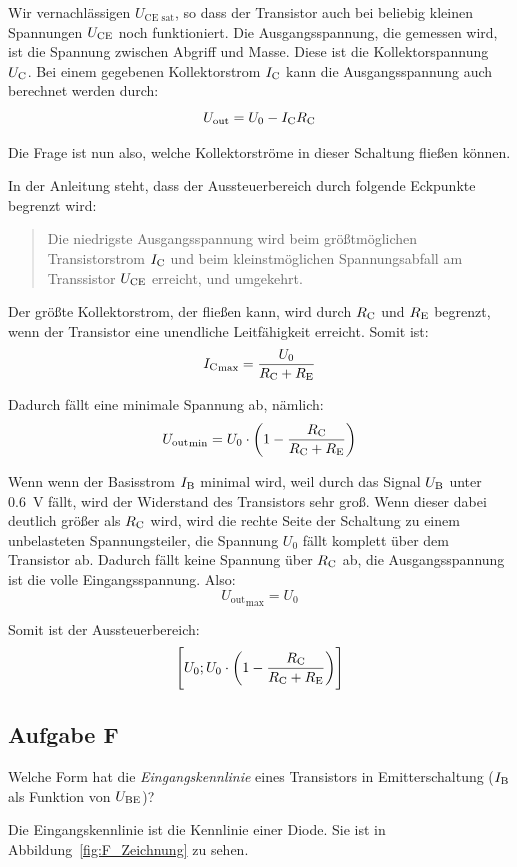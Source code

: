 Wir vernachlässigen $U_\text{CE sat}$, so dass der Transistor auch bei beliebig
kleinen Spannungen $U_\text{CE}$ noch funktioniert. Die Ausgangsspannung, die gemessen
wird, ist die Spannung zwischen Abgriff und Masse. Diese ist die
Kollektorspannung $U_\text{C}$. Bei einem gegebenen Kollektorstrom $I_\text{C}$ kann die
Ausgangsspannung auch berechnet werden durch:
\[
	U_\text{out} = U_0 - I_\text{C}R_\text{C}
\]

Die Frage ist nun also, welche Kollektorströme in dieser Schaltung fließen
können.

In der Anleitung steht, dass der Aussteuerbereich durch folgende
Eckpunkte begrenzt wird:

\begin{quote}
	Die niedrigste Ausgangsspannung wird beim größtmöglichen Transistorstrom
	$I_\text{C}$ und beim kleinstmöglichen Spannungsabfall am Transsistor $U_\text{CE}$
	erreicht, und umgekehrt. \cite[§3/4.3.1]{physik313-Anleitung}
\end{quote}

Der größte Kollektorstrom, der fließen kann, wird durch $R_\text{C}$ und $R_\text{E}$
begrenzt, wenn der Transistor eine unendliche Leitfähigkeit erreicht. Somit
ist:
\[
	{I_\text{C}}_\text{max} = \frac{U_0}{R_\text{C} + R_\text{E}}
\]

Dadurch fällt eine minimale Spannung ab, nämlich:
\[
	{U_\text{out}}_\text{min} = U_0 \cdot \del{1 - \frac{\RC}{\RC + \RE}}
\]

Wenn wenn der Basisstrom $I_\text{B}$ minimal wird, weil durch das Signal $U_\text{B}$
unter \SI{0.6}{\volt} fällt, wird der Widerstand des Transistors sehr groß.
Wenn dieser dabei deutlich größer als $R_\text{C}$ wird, wird die rechte Seite der
Schaltung zu einem unbelasteten Spannungsteiler, die Spannung $U_0$ fällt
komplett über dem Transistor ab. Dadurch fällt keine Spannung über $R_\text{C}$ ab,
die Ausgangsspannung ist die volle Eingangsspannung. Also:
\[
	{U_\text{out}}_\text{max} = U_0
\]

Somit ist der Aussteuerbereich:
\[
	\intcc{U_0; U_0 \cdot \del{1 - \frac{\RC}{\RC + \RE}}}
\]

\FloatBarrier
\subsection{Aufgabe F}

\begin{problem}
	Welche Form hat die \emph{Eingangskennlinie} eines Transistors in
	Emitterschaltung ($I_\text{B}$ als Funktion von $U_\text{BE}$)?
\end{problem}

Die Eingangskennlinie ist die Kennlinie einer Diode. Sie ist in
Abbildung~\ref{fig:F_Zeichnung} zu sehen.

